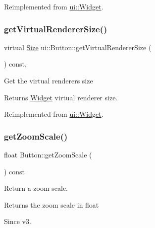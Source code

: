 Reimplemented from \hyperlink{classui_1_1Widget_a2ed0d41565593f78dc59c975d58a869e}{ui\+::\+Widget}.

\mbox{\label{classui_1_1Button_a098e64c65b080b1333cdefc5cd24201d}} 
\subsubsection{\texorpdfstring{get\+Virtual\+Renderer\+Size()}{getVirtualRendererSize()}\hspace{0.1cm}{\footnotesize\ttfamily [2/2]}}
{\footnotesize\ttfamily virtual \hyperlink{classSize}{Size} ui\+::\+Button\+::get\+Virtual\+Renderer\+Size (\begin{DoxyParamCaption}{ }\end{DoxyParamCaption}) const\hspace{0.3cm}{\ttfamily [override]}, {\ttfamily [virtual]}}

Get the virtual renderer\textquotesingle{}s size \begin{DoxyReturn}{Returns}
\hyperlink{classui_1_1Widget}{Widget} virtual renderer size. 
\end{DoxyReturn}


Reimplemented from \hyperlink{classui_1_1Widget_a2ed0d41565593f78dc59c975d58a869e}{ui\+::\+Widget}.

\mbox{\label{classui_1_1Button_a8a8bf6063a2653a7fb17c98c25f45e29}} 
\subsubsection{\texorpdfstring{get\+Zoom\+Scale()}{getZoomScale()}\hspace{0.1cm}{\footnotesize\ttfamily [1/2]}}
{\footnotesize\ttfamily float Button\+::get\+Zoom\+Scale (\begin{DoxyParamCaption}{ }\end{DoxyParamCaption}) const}



Return a zoom scale. 

\begin{DoxyReturn}{Returns}
the zoom scale in float 
\end{DoxyReturn}
\begin{DoxySince}{Since}
v3. 
\end{DoxySince}
\mbox{\label{classui_1_1Button_a32a4bc104062bb054ea294865062601d}} 
